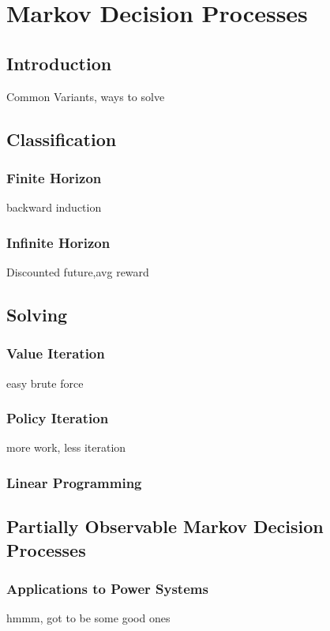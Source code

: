 
\chapter{Markov Decision Processes}




\section{Introduction}
Common Variants, ways to solve
\section{Classification}
\subsection{Finite Horizon}
backward induction
\subsection{Infinite Horizon}
Discounted future,avg reward
\section{Solving}
\subsection{Value Iteration}
easy brute force
\subsection{Policy Iteration}
more work, less iteration
\subsection{Linear Programming}
\section{Partially Observable Markov Decision Processes}
\subsection{Applications to Power Systems}
hmmm, got to be some good ones